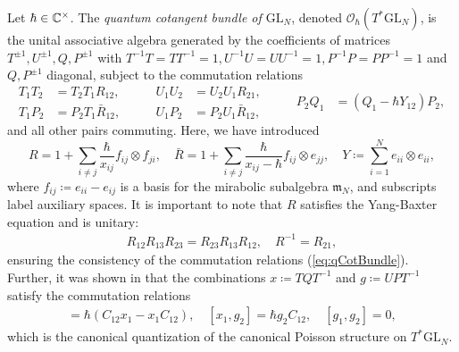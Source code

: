 \begin{definition}
Let $\hbar \in \mathbb{C}^\times$. The \emph{quantum cotangent bundle of $\mathrm{GL}_N$}, denoted $\mathcal{O}_\hbar(T^* \mathrm{GL}_N)$, is the  unital associative algebra generated by the coefficients of matrices $T^{\pm 1},U^{\pm 1},Q,P^{\pm 1}$ with $T^{-1} T = TT^{-1} = 1, U^{-1} U = UU^{-1} = 1, P^{-1} P = PP^{-1} = 1$ and $Q,P^{\pm 1}$ diagonal, subject to the commutation relations
\begin{equation}\label{eq:qCotBundle}
\begin{aligned}
T_1 T_2 &= T_2 T_1 R_{12}, \\
T_1 P_2 &= P_2 T_1 \bar R_{12},
\end{aligned}
\qquad
\begin{aligned}
U_1 U_2 &= U_2 U_1 R_{21}, \\
U_1 P_2 &= P_2 U_1 \bar R_{12},
\end{aligned}
\qquad
\begin{aligned}
P_2 Q_1 &= (Q_1 - \hbar Y_{12}) P_2,
\end{aligned}
\end{equation}
and all other pairs commuting. Here, we have introduced
\begin{equation}
R = 1 + \sum_{i \neq j} \frac{\hbar}{x_{ij}} f_{ij} \otimes f_{ji}, \quad \bar R = 1 + \sum_{i \neq j} \frac{\hbar}{x_{ij}-\hbar} f_{ij} \otimes e_{jj}, \quad
Y \coloneq \sum_{i=1}^N e_{ii} \otimes e_{ii},
\end{equation}
where $f_{ij} \coloneq e_{ii}-e_{ij}$ is a basis for the mirabolic subalgebra $\mathfrak{m}_N$, and subscripts label auxiliary spaces. It is important to note that $R$ satisfies the Yang-Baxter equation and is unitary:
\begin{align}
R_{12} R_{13} R_{23} = R_{23} R_{13} R_{12}, \quad R^{-1} = R_{21},
\end{align}
ensuring the consistency of the commutation relations (\ref{eq:qCotBundle}). Further, it was shown in \cite{arutyunov_quantum_1996} that the combinations $x \coloneq TQT^{-1}$ and $g \coloneq UPT^{-1}$ satisfy the commutation relations
\begin{align}
[x_1,x_2] = \hbar(C_{12} x_1-x_1 C_{12}), \quad [x_1,g_2] = \hbar g_2 C_{12}, \quad [g_1,g_2] = 0,
\end{align}
which is the canonical quantization of the canonical Poisson structure on $T^* \mathrm{GL}_N$.
\end{definition}

